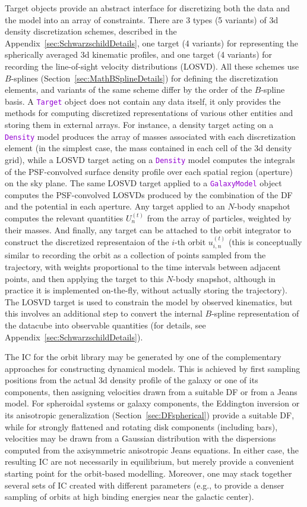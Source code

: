 \documentclass[12pt]{article}
\newcommand{\ttt}[1]{\textcolor{darkviolet}{\texttt{#1}}}
\begin{document}
Target objects provide an abstract interface for discretizing both the data and the model into an array of constraints. There are 3 types (5 variants) of 3d density discretization schemes, described in the Appendix~\ref{sec:SchwarzschildDetails}, one target (4 variants) for representing the spherically averaged 3d kinematic profiles, and one target (4 variants) for recording the line-of-sight velocity distributions (LOSVD). All these schemes use $B$-splines (Section~\ref{sec:MathBSplineDetails}) for defining the discretization elements, and variants of the same scheme differ by the order of the $B$-spline basis.
A \ttt{Target} object does not contain any data itself, it only provides the methods for computing discretized representations of various other entities and storing them in external arrays.
For instance, a density target acting on a \ttt{Density} model produces the array of masses associated with each discretization element (in the simplest case, the mass contained in each cell of the 3d density grid), while a LOSVD target acting on a \ttt{Density} model computes the integrals of the PSF-convolved surface density profile over each spatial region (aperture) on the sky plane. The same LOSVD target applied to a \ttt{GalaxyModel} object computes the PSF-convolved LOSVDs produced by the combination of the DF and the potential in each aperture. Any target applied to an $N$-body snapshot computes the relevant quantities $U_n^{(t)}$ from the array of particles, weighted by their masses. And finally, any target can be attached to the orbit integrator to construct the discretized representaion of the $i$-th orbit $u_{i,n}^{(t)}$ (this is conceptually similar to recording the orbit as a collection of points sampled from the trajectory, with weights proportional to the time intervals between adjacent points, and then applying the target to this $N$-body snapshot, although in practice it is implemented on-the-fly, without actually storing the trajectory). The LOSVD target is used to constrain the model by observed kinematics, but this involves an additional step to convert the internal $B$-spline representation of the datacube into observable quantities (for details, see Appendix~\ref{sec:SchwarzschildDetails}).

The IC for the orbit library may be generated by one of the complementary approaches for constructing dynamical models. This is achieved by first sampling positions from the actual 3d density profile of the galaxy or one of its components, then assigning velocities drawn from a suitable DF or from a Jeans model. For spheroidal systems or galaxy components, the Eddington inversion or its anisotropic generalization (Section~\ref{sec:DFspherical}) provide a suitable DF, while for strongly flattened and rotating disk components (including bars), velocities may be drawn from a Gaussian distribution with the dispersions computed from the axisymmetric anisotropic Jeans equations. In either case, the resulting IC are not necessarily in equilibrium, but merely provide a convenient starting point for the orbit-based modelling. Moreover, one may stack together several sets of IC created with different parameters (e.g., to provide a denser sampling of orbits at high binding energies near the galactic center).
\end{document}
